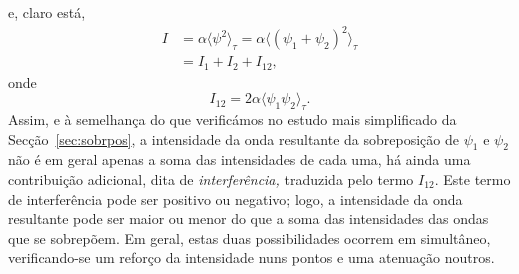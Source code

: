e, claro está,
\begin{align}
I&=\alpha\langle\psi^2\rangle_\tau=
  \alpha\langle(\psi_1+\psi_2)^2\rangle_\tau\nonumber\\
&=I_1+I_2+I_{12},\label{eq:superp2}
\end{align}
onde
\begin{equation*}
I_{12}=2\alpha\langle\psi_1\psi_2\rangle_\tau.
\end{equation*}
Assim, e à semelhança do que verificámos no estudo mais simplificado da
Secção~\ref{sec:sobrpos}, a intensidade da onda resultante da sobreposição de
$\psi_1$ e $\psi_2$ não é em geral apenas a soma das intensidades de cada uma,
há ainda uma contribuição adicional, dita de \emph{interferência,} traduzida
pelo termo $I_{12}$. Este termo de interferência pode ser positivo ou negativo;
logo, a intensidade da onda resultante pode ser maior ou menor do que a soma das
intensidades das ondas que se sobrepõem. Em geral, estas duas possibilidades
ocorrem em simultâneo, verificando-se um reforço da intensidade nuns pontos e
uma atenuação noutros. 

